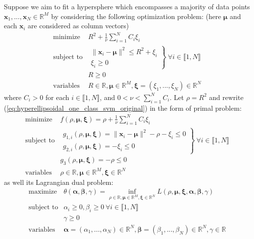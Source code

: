 \documentclass{article}
\newcommand{\real}{\mathbb{R}}
\def\vecx{{\mathbf x}}
\def\vecalpha{{\mathbf \alpha}}
\def\vecbeta{{\mathbf \beta}}
\def\vecmu{{\boldsymbol \mu}}
\def\vecxi{{\boldsymbol \xi}}
\def\real{{\mathbb {R}}}
\begin{document}
Suppose we aim to fit a hypersphere which encompasses a majority of data points $\vecx_1,...,\vecx_N \in \real^M$ by considering the following optimization problem: (here $\vecmu$ and each $\vecx_i$ are considered as column vectors)
\begin{equation}\label{eq:hyperellipsoidal_one_class_svm_original}
\begin{array}{ll}
\mbox{minimize} 	& R^2 + \frac{1}{\nu}\sum_{i=1}^N C_i\xi_i\\
\mbox{subject to} 	& \left.\begin{array}{l}\|\vecx_i-\vecmu\|^2 \leq R^2 + \xi_i\\ \xi_i \geq 0\end{array}\right\} ~ \forall i \in \llbracket 1,N\rrbracket\\
				& R \geq 0\\
\mbox{variables} 	& R \in \real, \vecmu \in \real^M, \vecxi = (\xi_1,...,\xi_N) \in \real^N
\end{array}
\end{equation}
%
where $C_i > 0$ for each $i \in \llbracket 1,N\rrbracket$, and $0< \nu < \sum_{i=1}^N C_i$.  Let $\rho = R^2$ and rewrite (\ref{eq:hyperellipsoidal_one_class_svm_original}) in the form of primal problem:
\begin{equation}\label{eq:hyperellipsoidal_one_class_svm_primal}
\begin{array}{ll}
\mbox{minimize} 	& f(\rho,\vecmu,\vecxi) = \rho + \frac{1}{\nu}\sum_{i=1}^N C_i\xi_i\\
\mbox{subject to} 	& \left.\begin{array}{l}g_{1,i}(\rho,\vecmu,\vecxi) = \|\vecx_i-\vecmu\|^2 - \rho - \xi_i \leq 0\\ 
					g_{2,i}(\rho,\vecmu,\vecxi) = -\xi_i \leq 0\end{array}\right\} ~ \forall i \in \llbracket 1,N\rrbracket\\
				& g_3(\rho,\vecmu,\vecxi) = -\rho \leq 0\\
\mbox{variables} 	& \rho \in \real, \vecmu \in \real^M, \vecxi \in \real^N
\end{array}
\end{equation}
%
as well its Lagrangian dual problem:
\begin{equation}\label{eq:hyperellipsoidal_one_class_svm_dual_pre}
\begin{array}{ll}
\mbox{maximize} 	& \theta(\vecalpha,\vecbeta,\gamma) = \inf_{\rho \in \real, \vecmu \in \real^M, \vecxi \in \real^N}L(\rho,\vecmu,\vecxi,\vecalpha,\vecbeta,\gamma)\\
\mbox{subject to} 	& \alpha_i \geq 0, \beta_i \geq 0 ~ \forall i \in \llbracket 1,N\rrbracket \\
				& \gamma \geq 0\\
\mbox{variables} 	& \vecalpha = (\alpha_1,...,\alpha_N) \in \real^N, \vecbeta = (\beta_1,...,\beta_N) \in \real^N, \gamma \in \real
\end{array}
\end{equation}
\end{document}
